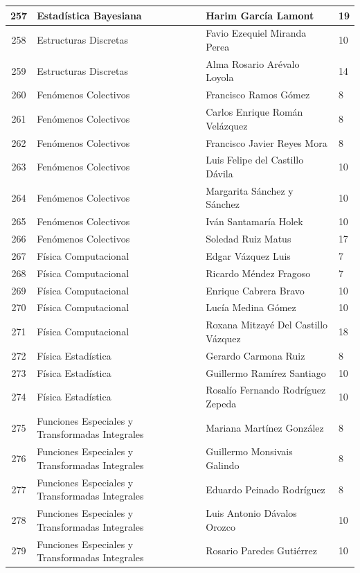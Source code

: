 {\begin{longtable}{|c|p{6.5cm}|p{5cm}|p{1.5cm}|}
  257 & Estadística Bayesiana & Harim García Lamont & 19 \\ \hline
  258 & Estructuras Discretas & Favio Ezequiel Miranda Perea & 10 \\ \hline
  259 & Estructuras Discretas & Alma Rosario Arévalo Loyola & 14 \\ \hline
  260 & Fenómenos Colectivos & Francisco Ramos Gómez & 8 \\ \hline
  261 & Fenómenos Colectivos & Carlos Enrique Román Velázquez & 8 \\ \hline
  262 & Fenómenos Colectivos & Francisco Javier Reyes Mora & 8 \\ \hline
  263 & Fenómenos Colectivos & Luis Felipe del Castillo Dávila & 10 \\ \hline
  264 & Fenómenos Colectivos & Margarita Sánchez y Sánchez & 10 \\ \hline
  265 & Fenómenos Colectivos & Iván Santamaría Holek & 10 \\ \hline
  266 & Fenómenos Colectivos & Soledad Ruiz Matus & 17 \\ \hline
  267 & Física Computacional & Edgar Vázquez Luis & 7 \\ \hline
  268 & Física Computacional & Ricardo Méndez Fragoso & 7 \\ \hline
  269 & Física Computacional & Enrique Cabrera Bravo & 10 \\ \hline
  270 & Física Computacional & Lucía Medina Gómez & 10 \\ \hline
  271 & Física Computacional & Roxana Mitzayé Del Castillo Vázquez & 18 \\ \hline
  272 & Física Estadística & Gerardo Carmona Ruiz & 8 \\ \hline
  273 & Física Estadística & Guillermo Ramírez Santiago & 10 \\ \hline
  274 & Física Estadística & Rosalío Fernando Rodríguez Zepeda & 10 \\ \hline
  275 & Funciones Especiales y Transformadas Integrales & Mariana Martínez González & 8 \\ \hline
  276 & Funciones Especiales y Transformadas Integrales & Guillermo Monsivais Galindo & 8 \\ \hline
  277 & Funciones Especiales y Transformadas Integrales & Eduardo Peinado Rodríguez & 8 \\ \hline
  278 & Funciones Especiales y Transformadas Integrales & Luis Antonio Dávalos Orozco & 10 \\ \hline
  279 & Funciones Especiales y Transformadas Integrales & Rosario Paredes Gutiérrez & 10 \\ \hline

\end{longtable}}
